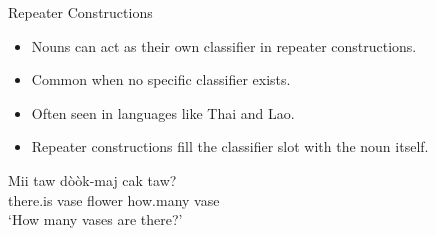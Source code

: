 \documentclass{beamer}
\begin{document}

\begin{frame}{Repeater Constructions}
\begin{itemize}
    \item Nouns can act as their own classifier in repeater constructions.
    \item Common when no specific classifier exists.
    \item Often seen in languages like Thai and Lao.
    \item Repeater constructions fill the classifier slot with the noun itself.
\end{itemize}
\begin{exe}
\ex
\gll Mii taw dòòk-maj cak taw? \\
    there.is vase flower how.many vase \\
\trans ‘How many vases are there?’ \\
\end{exe}
\end{frame}

\end{document}
